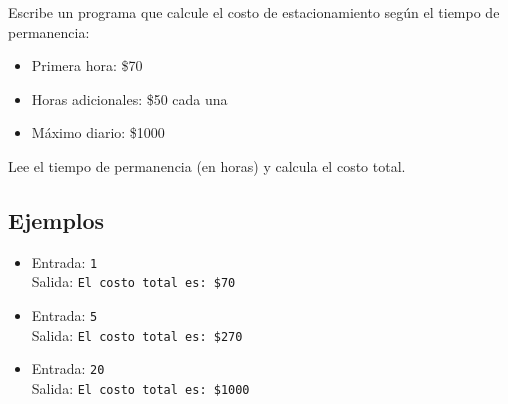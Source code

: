 Escribe un programa que calcule el costo de estacionamiento según el tiempo de permanencia:
\begin{itemize}
    \item Primera hora: \$70
    \item Horas adicionales: \$50 cada una
    \item Máximo diario: \$1000
\end{itemize}
Lee el tiempo de permanencia (en horas) y calcula el costo total.
\subsection*{Ejemplos}
\begin{itemize}
    \item Entrada: \texttt{1}\\
          Salida: \texttt{El costo total es: \$70}
    \item Entrada: \texttt{5}\\
          Salida: \texttt{El costo total es: \$270}
    \item Entrada: \texttt{20}\\
          Salida: \texttt{El costo total es: \$1000}
\end{itemize}